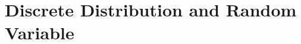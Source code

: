 \chapterspaceabove{6.75cm} 
\chapterspacebelow{7.25cm} 
\chapter{Discrete Distribution and Random Variable}